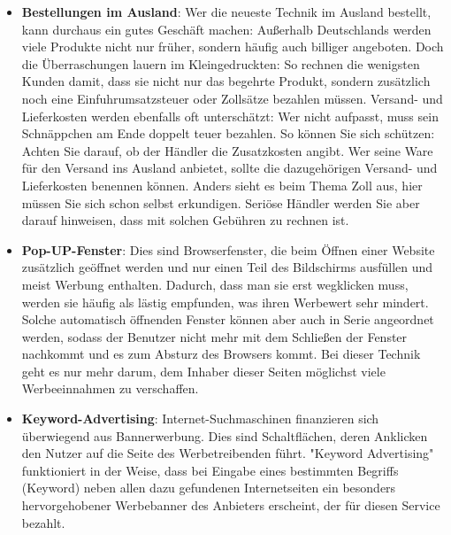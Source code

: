 \documentclass[a4paper]{article}
\begin{document}
\begin{itemize}
\item \textbf{Bestellungen im Ausland}: Wer die neueste Technik im Ausland bestellt, kann durchaus ein gutes Geschäft machen: Außerhalb Deutschlands werden viele Produkte nicht nur früher, sondern häufig auch billiger angeboten. Doch die Überraschungen lauern im Kleingedruckten: So rechnen die wenigsten Kunden damit, dass sie nicht nur das begehrte Produkt, sondern zusätzlich noch eine Einfuhrumsatzsteuer oder Zollsätze bezahlen müssen. Versand- und Lieferkosten werden ebenfalls oft unterschätzt: Wer nicht aufpasst, muss sein Schnäppchen am Ende doppelt teuer bezahlen. So können Sie sich schützen: Achten Sie darauf, ob der Händler die Zusatzkosten angibt. Wer seine Ware für den Versand ins Ausland anbietet, sollte die dazugehörigen Versand- und Lieferkosten benennen können. Anders sieht es beim Thema Zoll aus, hier müssen Sie sich schon selbst erkundigen. Seriöse Händler werden Sie aber darauf hinweisen, dass mit solchen Gebühren zu rechnen ist.

\item \textbf{Pop-UP-Fenster}: Dies sind Browserfenster, die beim Öffnen einer Website zusätzlich geöffnet werden und nur einen Teil des Bildschirms ausfüllen und meist Werbung enthalten. Dadurch, dass man sie erst wegklicken muss, werden sie häufig als lästig empfunden, was ihren Werbewert sehr mindert. Solche automatisch öffnenden Fenster können aber auch in Serie angeordnet werden, sodass der Benutzer nicht mehr mit dem Schließen der Fenster nachkommt und es zum Absturz des Browsers kommt. Bei dieser Technik geht es nur mehr darum, dem Inhaber dieser Seiten möglichst viele Werbeeinnahmen zu verschaffen.

\item \textbf{Keyword-Advertising}: Internet-Suchmaschinen finanzieren sich überwiegend aus Bannerwerbung. Dies sind  Schaltflächen, deren Anklicken den Nutzer auf die Seite des Werbetreibenden führt. "Keyword Advertising" funktioniert in der Weise, dass bei Eingabe eines bestimmten Begriffs (Keyword) neben allen dazu gefundenen Internetseiten ein besonders hervorgehobener Werbebanner des Anbieters erscheint, der für diesen Service bezahlt.


\end{itemize}
\end{document}
